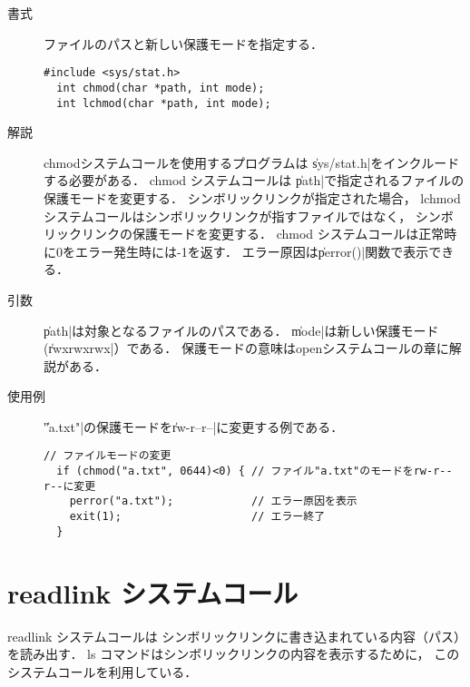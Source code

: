 \begin{description}
\item[書式] ファイルのパスと新しい保護モードを指定する．
\begin{lstlisting}[numbers=none]
  #include <sys/stat.h>
  int chmod(char *path, int mode);
  int lchmod(char *path, int mode);
\end{lstlisting}

\item[解説] chmodシステムコールを使用するプログラムは
\|sys/stat.h|をインクルードする必要がある．
chmod システムコールは
\|path|で指定されるファイルの保護モードを変更する．
シンボリックリンクが指定された場合，
lchmod システムコールはシンボリックリンクが指すファイルではなく，
シンボリックリンクの保護モードを変更する．
chmod システムコールは正常時に0をエラー発生時には-1を返す．
エラー原因は\|perror()|関数で表示できる．

\item[引数] \|path|は対象となるファイルのパスである．
\|mode|は新しい保護モード(\|rwxrwxrwx|）である．
保護モードの意味はopenシステムコールの章に解説がある．

\item[使用例] \|"a.txt"|の保護モードを\|rw-r--r--|に変更する例である．
\begin{lstlisting}[numbers=none]
  // ファイルモードの変更
  if (chmod("a.txt", 0644)<0) { // ファイル"a.txt"のモードをrw-r--r--に変更
    perror("a.txt");            // エラー原因を表示
    exit(1);                    // エラー終了
  }
\end{lstlisting}
\end{description}

\section{readlink システムコール}

readlink システムコールは
シンボリックリンクに書き込まれている内容（パス）を読み出す．
ls コマンドはシンボリックリンクの内容を表示するために，
このシステムコールを利用している．

